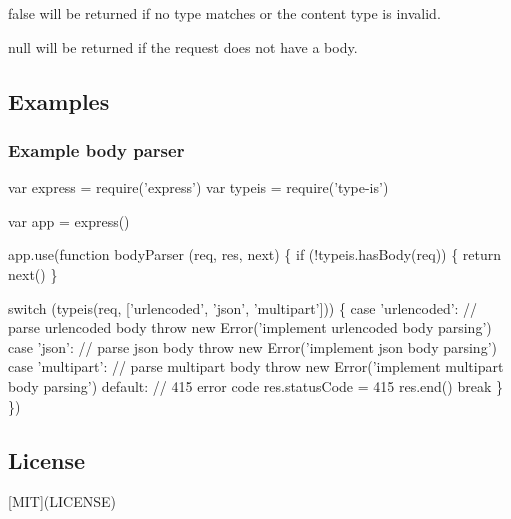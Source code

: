{\ttfamily false} will be returned if no type matches or the content type is invalid.

{\ttfamily null} will be returned if the request does not have a body.

\subsection*{Examples}

\subsubsection*{Example body parser}


\begin{DoxyCode}
var express = require('express')
var typeis = require('type-is')

var app = express()

app.use(function bodyParser (req, res, next) \{
  if (!typeis.hasBody(req)) \{
    return next()
  \}

  switch (typeis(req, ['urlencoded', 'json', 'multipart'])) \{
    case 'urlencoded':
      // parse urlencoded body
      throw new Error('implement urlencoded body parsing')
    case 'json':
      // parse json body
      throw new Error('implement json body parsing')
    case 'multipart':
      // parse multipart body
      throw new Error('implement multipart body parsing')
    default:
      // 415 error code
      res.statusCode = 415
      res.end()
      break
  \}
\})
\end{DoxyCode}


\subsection*{License}

\mbox{[}M\+IT\mbox{]}(L\+I\+C\+E\+N\+SE) 
